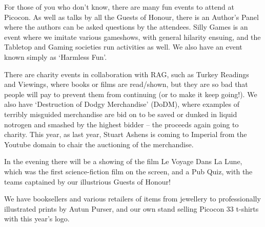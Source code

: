 For those of you who don't know, there are many fun events to attend at Picocon. As well as talks by all the Guests of Honour, there is an Author’s Panel where the authors can be asked questions by the attendees. Silly Games is an event where we imitate various gameshows, with general hilarity ensuing, and the Tabletop and Gaming societies run activities as well. We also have an event known simply as ‘Harmless Fun’. 

There are charity events in collaboration with RAG, such as Turkey Readings and Viewings, where books or films are read/shown, but they are so bad that people will pay to prevent them from continuing (or to make it keep going!). We also have ‘Destruction of Dodgy Merchandise’ (DoDM), where examples of terribly misguided merchandise are bid on to be saved or dunked in liquid notrogen and smashed by the highest bidder – the proceeds again going to charity. This year, as last year, Stuart Ashens is coming to Imperial from the Youtube domain to chair the auctioning of the merchandise.

In the evening there will be a showing of the film Le Voyage Dans La Lune, which was the first science-fiction film on the screen, and a Pub Quiz, with the teams captained by our illustrious Guests of Honour! 

We have booksellers and various retailers of items from jewellery to professionally illustrated prints by Autun Purser, and our own stand selling Picocon 33 t-shirts with this year’s logo.